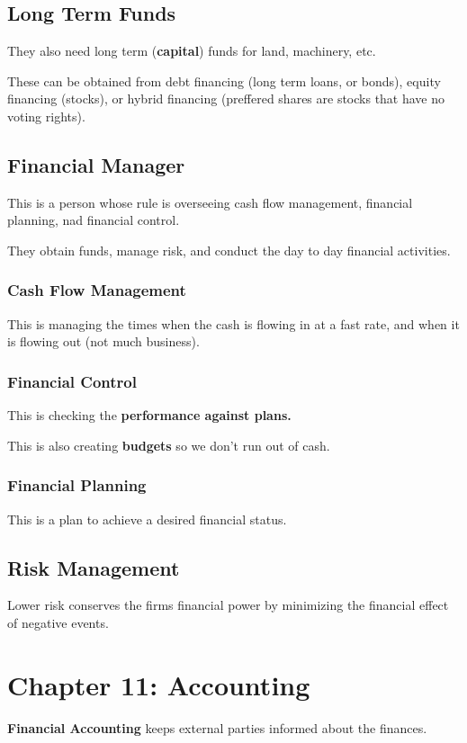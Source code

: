 \documentclass[12pt,letterpaper]{article} \usepackage{amsmath} \usepackage{graphicx} \usepackage[margin=1in]{geometry} \usepackage{longtable}  \usepackage{amssymb}
\begin{document}
		\subsection{Long Term Funds}
		They also need long term (\textbf{capital}) funds for land, machinery, etc. 
		
		These can be obtained from debt financing (long term loans, or bonds), equity financing (stocks), or hybrid financing (preffered shares are stocks that have no voting rights). 
		
		\subsection{Financial Manager}
		This is a person whose rule is overseeing cash flow management, financial planning, nad financial control.
		
		They obtain funds, manage risk, and conduct the day to day financial activities. 
		
		\subsubsection{Cash Flow Management}
		This is managing the times when the cash is flowing in at a fast rate, and when it is flowing out (not much business).
		
		\subsubsection{Financial Control}
		This is checking the \textbf{performance against plans. }
		
		This is also creating \textbf{budgets} so we don't run out of cash. 
		
		\subsubsection{Financial Planning}
		This is a plan to achieve a desired financial status. 
		
		\subsection{Risk Management}
		Lower risk conserves the firms financial power by minimizing the financial effect of negative events. 
		
		
		\section{Chapter 11: Accounting}
		\textbf{Financial Accounting} keeps external parties informed about the finances. 
		
\end{document}
